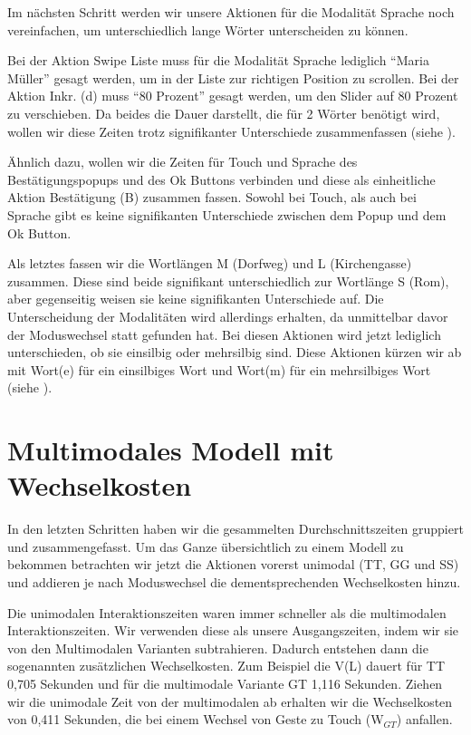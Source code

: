 Im nächsten Schritt werden wir unsere Aktionen für die Modalität Sprache noch vereinfachen, um unterschiedlich lange Wörter unterscheiden zu können. 

Bei der Aktion Swipe Liste muss für die Modalität Sprache lediglich "`Maria Müller"' gesagt werden, um in der Liste zur richtigen Position zu scrollen. Bei der Aktion Inkr. (d) muss "`80 Prozent"' gesagt werden, um den Slider auf 80 Prozent zu verschieben. 
Da beides die Dauer darstellt, die für 2 Wörter benötigt wird, wollen wir diese Zeiten trotz signifikanter Unterschiede zusammenfassen (siehe ). 

Ähnlich dazu, wollen wir die Zeiten für Touch und Sprache des Bestätigungspopups und des Ok Buttons verbinden und diese als einheitliche Aktion Bestätigung (B) zusammen fassen. Sowohl bei Touch, als auch bei Sprache gibt es keine signifikanten Unterschiede zwischen dem Popup und dem Ok Button.

Als letztes fassen wir die Wortlängen M (Dorfweg) und L (Kirchengasse) zusammen. 
Diese sind beide signifikant unterschiedlich zur Wortlänge S (Rom), aber gegenseitig weisen sie keine signifikanten Unterschiede auf. 
Die Unterscheidung der Modalitäten wird allerdings erhalten, da unmittelbar davor der Moduswechsel statt gefunden hat. 
Bei diesen Aktionen wird jetzt lediglich unterschieden, ob sie einsilbig oder mehrsilbig sind. 
Diese Aktionen kürzen wir ab mit Wort(e) für ein einsilbiges Wort und Wort(m) für ein mehrsilbiges Wort (siehe ).

\section[Multimodales Modell]{Multimodales Modell mit Wechselkosten}
In den letzten Schritten haben wir die gesammelten Durchschnittszeiten gruppiert und zusammengefasst. Um das Ganze übersichtlich zu einem Modell zu bekommen betrachten wir jetzt die Aktionen vorerst unimodal (TT, GG und SS) und addieren je nach Moduswechsel die dementsprechenden Wechselkosten hinzu. 

Die unimodalen Interaktionszeiten waren immer schneller als die multimodalen Interaktionszeiten. Wir verwenden diese als unsere Ausgangszeiten, indem wir sie von den Multimodalen Varianten subtrahieren. Dadurch entstehen dann die sogenannten zusätzlichen Wechselkosten. Zum Beispiel die V(L) dauert für TT 0,705 Sekunden und für die multimodale Variante GT 1,116 Sekunden. Ziehen wir die unimodale Zeit von der multimodalen ab erhalten wir die Wechselkosten von 0,411 Sekunden, die bei einem Wechsel von Geste zu Touch (W$_{GT}$) anfallen. 


